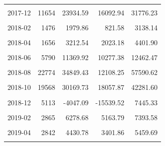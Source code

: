 \begin{longtable}[t]{crrrr}
\cellcolor{gray!10}{2017-11} & \cellcolor{gray!10}{19334} & \cellcolor{gray!10}{35407.47} & \cellcolor{gray!10}{29518.58} & \cellcolor{gray!10}{41296.35}\\
2017-12 & 11654 & 23934.59 & 16092.94 & 31776.23\\
\cellcolor{gray!10}{2018-01} & \cellcolor{gray!10}{2553} & \cellcolor{gray!10}{2786.61} & \cellcolor{gray!10}{864.10} & \cellcolor{gray!10}{4709.13}\\
2018-02 & 1476 & 1979.86 & 821.58 & 3138.14\\
\cellcolor{gray!10}{2018-03} & \cellcolor{gray!10}{2657} & \cellcolor{gray!10}{5515.68} & \cellcolor{gray!10}{4186.46} & \cellcolor{gray!10}{6844.90}\\
2018-04 & 1656 & 3212.54 & 2023.18 & 4401.90\\
\cellcolor{gray!10}{2018-05} & \cellcolor{gray!10}{3366} & \cellcolor{gray!10}{6254.04} & \cellcolor{gray!10}{5619.01} & \cellcolor{gray!10}{6889.06}\\
2018-06 & 5790 & 11369.92 & 10277.38 & 12462.47\\
\cellcolor{gray!10}{2018-07} & \cellcolor{gray!10}{12652} & \cellcolor{gray!10}{20919.76} & \cellcolor{gray!10}{18368.89} & \cellcolor{gray!10}{23470.62}\\
2018-08 & 22774 & 34849.43 & 12108.25 & 57590.62\\
\cellcolor{gray!10}{2018-09} & \cellcolor{gray!10}{42251} & \cellcolor{gray!10}{88236.68} & \cellcolor{gray!10}{76804.49} & \cellcolor{gray!10}{99668.87}\\
2018-10 & 19568 & 30169.73 & 18057.87 & 42281.60\\
\cellcolor{gray!10}{2018-11} & \cellcolor{gray!10}{13014} & \cellcolor{gray!10}{11159.19} & \cellcolor{gray!10}{2259.98} & \cellcolor{gray!10}{20058.41}\\
2018-12 & 5113 & -4047.09 & -15539.52 & 7445.33\\
\cellcolor{gray!10}{2019-01} & \cellcolor{gray!10}{4030} & \cellcolor{gray!10}{8360.98} & \cellcolor{gray!10}{6392.78} & \cellcolor{gray!10}{10329.17}\\
2019-02 & 2865 & 6278.68 & 5163.79 & 7393.58\\
\cellcolor{gray!10}{2019-03} & \cellcolor{gray!10}{5213} & \cellcolor{gray!10}{17281.66} & \cellcolor{gray!10}{14335.44} & \cellcolor{gray!10}{20227.88}\\
2019-04 & 2842 & 4430.78 & 3401.86 & 5459.69\\
\cellcolor{gray!10}{2019-05} & \cellcolor{gray!10}{2963} & \cellcolor{gray!10}{5475.05} & \cellcolor{gray!10}{4751.41} & \cellcolor{gray!10}{6198.68}\\

\end{longtable}
